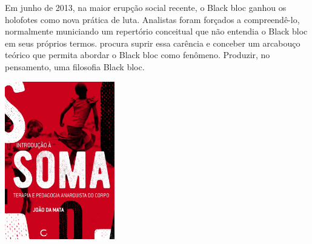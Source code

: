 \medskip

\noindent{}Em junho de 2013, na maior erupção social recente, o Black bloc ganhou os holofotes como nova prática de luta. Analistas foram forçados a compreendê-lo, normalmente municiando um repertório conceitual que não entendia o Black bloc em seus próprios termos. {} procura suprir essa carência e conceber um arcabouço teórico que permita abordar o Black bloc como fenômeno. Produzir, no pensamento, uma filosofia Black bloc.

\vfill

\hspace*{-.4cm}\begin{minipage}[c]{1\linewidth}
\small{
{}}
\end{minipage}

\pagebreak

\hspace{.5cm}

\begin{center}
\hspace*{-.5cm}\includegraphics[width=48mm]{./imgs/soma.jpg}
\end{center}

\hspace*{-7cm}\hrulefill\hspace*{-7cm}

\medskip


